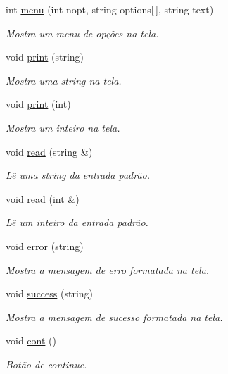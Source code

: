 \begin{DoxyCompactItemize}
\item 
int \hyperlink{classTextual_a8b74c4f42ad3e8109ade0f12db4ccf3a}{menu} (int nopt, string options\mbox{[}$\,$\mbox{]}, string text)
\begin{DoxyCompactList}\small\item\em Mostra um menu de opções na tela. \end{DoxyCompactList}\item 
void \hyperlink{classTextual_a79264d4c405089034447a553cd3859e5}{print} (string)
\begin{DoxyCompactList}\small\item\em Mostra uma string na tela. \end{DoxyCompactList}\item 
void \hyperlink{classTextual_aab79476a2e99375655df0bc3d8738536}{print} (int)
\begin{DoxyCompactList}\small\item\em Mostra um inteiro na tela. \end{DoxyCompactList}\item 
void \hyperlink{classTextual_a5998864514acbf61ca8d6fa1845d0d22}{read} (string \&)
\begin{DoxyCompactList}\small\item\em Lê uma string da entrada padrão. \end{DoxyCompactList}\item 
void \hyperlink{classTextual_a888e02776648906696eeaea0e8691cd6}{read} (int \&)
\begin{DoxyCompactList}\small\item\em Lê um inteiro da entrada padrão. \end{DoxyCompactList}\item 
void \hyperlink{classTextual_a42ebc971370c4de20314ee33cd863cb3}{error} (string)
\begin{DoxyCompactList}\small\item\em Mostra a mensagem de erro formatada na tela. \end{DoxyCompactList}\item 
void \hyperlink{classTextual_ab9edde475ba8687ce2ed448212405e12}{success} (string)
\begin{DoxyCompactList}\small\item\em Mostra a mensagem de sucesso formatada na tela. \end{DoxyCompactList}\item 
void \hyperlink{classTextual_a8125ca0d5ca9bebf728cc4bfbc4f8de4}{cont} ()
\begin{DoxyCompactList}\small\item\em Botão de continue. \end{DoxyCompactList}\end{DoxyCompactItemize}


